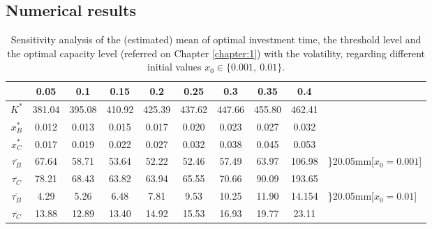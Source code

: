 \subsection{Numerical results}

\begin{table}[!ht]
	\centering
	\caption{Sensitivity analysis of the (estimated) mean of optimal investment time, the threshold level and the optimal capacity level (referred on Chapter \ref{chapter:1}) with the volatility, regarding different initial values $x_0 \in \{0.001, \ 0.01\}$.}
	\begin{tabular}{c|ccccccccl}
		\hline
		\text{ $\sigma $ } & 0.05 & 0.1 & 0.15 & 0.2 & 0.25 & 0.3 & 0.35 & 0.4 \\ \hline
		$K^*$ & 381.04 & 395.08 & 410.92 & 425.39 & 437.62 & 447.66 & 455.80 & 462.41 \\
		$x_B^*$ & 0.012 & 0.013 & 0.015 & 0.017 & 0.020 & 0.023 & 0.027 & 0.032 \\
		$x_C^*$ & 0.017 & 0.019 & 0.022 & 0.027 & 0.032 & 0.038 & 0.045 & 0.053 \\ \hline
		$\overline{\tau _B}$ & 67.64 & 58.71 & 53.64 & 52.22 & 52.46 & 57.49 & 63.97 & 106.98 & \rdelim\}{2}{0.05mm}[$x_0=0.001$]  \\
		$\overline{\tau _C}$ & 78.21 & 68.43 & 63.82 & 63.94 & 65.55 & 70.66 & 90.09 & 193.65 \\ \hline
		$\overline{\tau _B}$ & 4.29 & 5.26 & 6.48 & 7.81 & 9.53 & 10.25 & 11.90 & 14.154 &	\rdelim\}{2}{0.05mm}[$x_0=0.01$] \\
		$\overline{\tau _C}$ & 13.88 & 12.89 & 13.40 & 14.92 & 15.53 & 16.93 & 19.77 & 23.11
		\\ \hline
	\end{tabular}
	\label{tab:vol_1}
\end{table}


